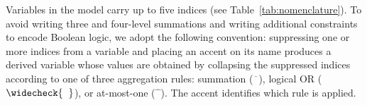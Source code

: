 
Variables in the model carry up to five indices (see
Table~\ref{tab:nomenclature}). To avoid writing three and four-level
summations and writing additional constraints to encode Boolean logic,
we adopt the following convention: suppressing one or more indices from
a variable and placing an accent on its name produces a derived
variable whose values are obtained by collapsing the suppressed indices
according to one of three aggregation rules: summation
($\overline{\phantom{x}}$), logical OR
($\widecheck{\phantom{x}}$), or at-most-one
($\widehat{\phantom{x}}$). The accent identifies which rule is
applied.

